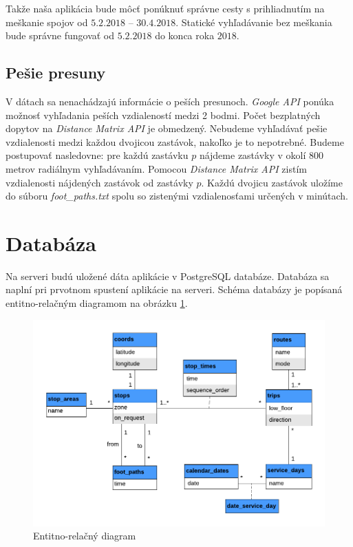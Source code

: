 Takže naša aplikácia bude môcť ponúknuť správne cesty s prihliadnutím na meškanie spojov od $5.2.2018$ – $30.4.2018$. Statické vyhľadávanie bez meškania bude správne fungovať od $5.2.2018$ do konca roka $2018$.

\subsection{Pešie presuny}
V dátach sa nenachádzajú informácie o peších presunoch. \textit{Google API} ponúka možnosť vyhľadania peších vzdialeností medzi 2 bodmi. Počet bezplatných dopytov na \textit{Distance Matrix API} je obmedzený. Nebudeme vyhľadávať pešie vzdialenosti medzi každou dvojicou zastávok, nakoľko je to nepotrebné. 
Budeme postupovať nasledovne: pre každú zastávku $p$ nájdeme zastávky v okolí 800 metrov radiálnym vyhľadávaním. Pomocou \textit{Distance Matrix API} zistím vzdialenosti nájdených zastávok od zastávky $p$. Každú dvojicu zastávok uložíme do súboru \textit{foot\_paths.txt} spolu so zistenými vzdialenosťami určených v minútach.


\section{Databáza}

Na serveri budú uložené dáta aplikácie v PostgreSQL databáze. Databáza sa naplní pri prvotnom spustení aplikácie na serveri. Schéma databázy je popísaná entitno-relačným diagramom na obrázku \ref{fig:erd}.

\begin{figure}[H]
\centerline{\includegraphics[width=1.0\textwidth]{images/ERD}}
\caption[Entitno-relačný diagram]{Entitno-relačný diagram}
\label{fig:erd}
\end{figure}

